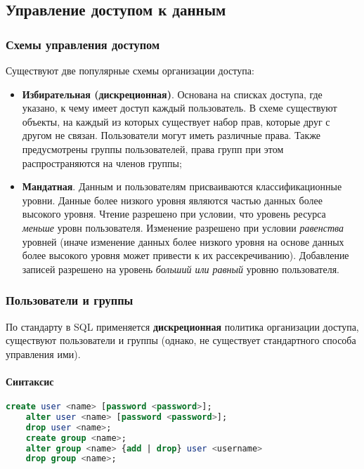 \subsection{Управление доступом к данным}

\subsubsection{Схемы управления доступом}

Существуют две популярные схемы организации доступа:

\begin{itemize}
	\item \textbf{Избирательная (дискреционная)}. Основана на списках доступа, где указано, к чему
	      имеет доступ каждый пользователь. В схеме существуют объекты, на каждый из которых существует набор
	      прав, которые друг с другом не связан. Пользователи могут иметь различные права. Также
	      предусмотрены группы пользователей, права групп при этом распространяются на членов группы;
	\item \textbf{Мандатная}. Данным и пользователям присваиваются классификационные уровни. Данные
	      более низкого уровня являются частью данных более высокого уровня. Чтение разрешено при условии,
	      что уровень ресурса \textit{меньше} уровн пользователя. Изменение разрешено при условии
	      \textit{равенства} уровней (иначе изменение данных более низкого уровня на основе данных более
	      высокого уровня может привести к их рассекречиванию). Добавление записей разрешено на уровень
	      \textit{больший или равный} уровню пользователя.
\end{itemize}

\subsubsection{Пользователи и группы}

По стандарту в SQL применяется \textbf{дискреционная} политика организации доступа, существуют
пользователи и группы (однако, не существует стандартного способа управления ими).

\paragraph{Синтаксис}
\enewline

\begin{lstlisting}[language=SQL]
    create user <name> [password <password>];
    alter user <name> [password <password>];
    drop user <name>;
    create group <name>;
    alter group <name> {add | drop} user <username>
    drop group <name>;
\end{lstlisting}


